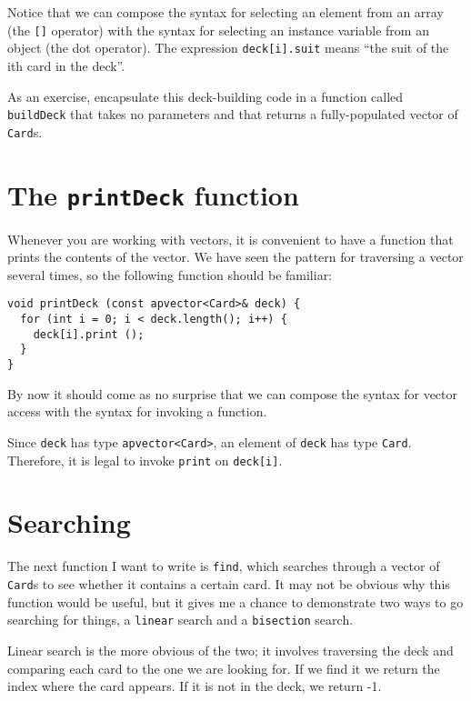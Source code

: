 
Notice that we can compose the syntax for selecting an element
from an array (the {\tt []} operator) with the syntax for
selecting an instance variable from an object (the dot
operator).  The expression {\tt deck[i].suit} means 
``the suit of the ith card in the deck''.


As an exercise, encapsulate this deck-building code in a function called
{\tt buildDeck} that takes no parameters and that returns a
fully-populated vector of {\tt Card}s.

\section{The {\tt printDeck} function}
\label{printdeck}

Whenever you are working with vectors, it is convenient to have
a function that prints the contents of the vector.  We have
seen the pattern for traversing a vector several times, so the
following function should be familiar:

\begin{verbatim}
void printDeck (const apvector<Card>& deck) {
  for (int i = 0; i < deck.length(); i++) {
    deck[i].print ();
  }
}
\end{verbatim}
%
By now it should come as no surprise that we can compose the
syntax for vector access with the syntax for invoking a function.

Since {\tt deck} has type {\tt apvector<Card>}, an element of {\tt deck}
has type {\tt Card}.  Therefore, it is legal to invoke {\tt print}
on {\tt deck[i]}.

\section{Searching}
\label{find}

The next function I want to write is {\tt find}, which searches
through a vector of {\tt Card}s to see whether it contains a certain
card.  It may not be obvious why this function would be useful, but it
gives me a chance to demonstrate two ways to go searching for things,
a {\tt linear} search and a {\tt bisection} search.


Linear search is the more obvious of the two; it involves traversing
the deck and comparing each card to the one we are looking for.  If we
find it we return the index where the card appears.  If it is not in
the deck, we return -1.

